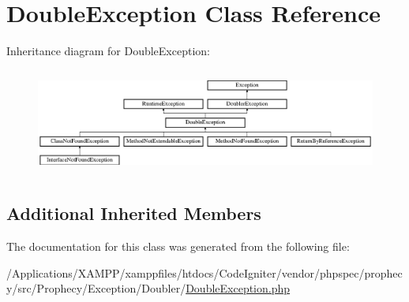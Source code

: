 \hypertarget{class_prophecy_1_1_exception_1_1_doubler_1_1_double_exception}{}\section{Double\+Exception Class Reference}
\label{class_prophecy_1_1_exception_1_1_doubler_1_1_double_exception}
Inheritance diagram for Double\+Exception\+:\begin{figure}[H]
\begin{center}
\leavevmode
\includegraphics[height=3.535354cm]{class_prophecy_1_1_exception_1_1_doubler_1_1_double_exception}
\end{center}
\end{figure}
\subsection*{Additional Inherited Members}


The documentation for this class was generated from the following file\+:\begin{DoxyCompactItemize}
\item 
/\+Applications/\+X\+A\+M\+P\+P/xamppfiles/htdocs/\+Code\+Igniter/vendor/phpspec/prophecy/src/\+Prophecy/\+Exception/\+Doubler/\mbox{\hyperlink{_double_exception_8php}{Double\+Exception.\+php}}\end{DoxyCompactItemize}
